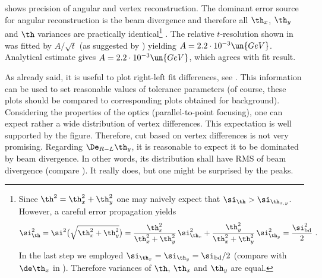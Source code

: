 
 shows precision of angular and vertex reconstruction. The dominant error source for angular reconstruction is the beam divergence and therefore all $\th_x$, $\th_y$ and $\th$ variances are practically identical\footnote{%
Since $\th^2 = \th_x^2 + \th_y^2$ one may naively expect that $\si_{\th} > \si_{\th_{x, y}}$. However, a careful error propagation yields
$$\si^2_{\th} = \si^2\big(\sqrt{\th_x^2 + \th_y^2}\big) = {\th_x^2\over \th_x^2 + \th_y^2}\, \si^2_{\th_x} + {\th_y^2\over \th_x^2 + \th_y^2}\, \si^2_{\th_y} = {\si^2_{\rm bd}\over 2}\ .$$
In the last step we employed $\si_{\th_x} = \si_{\th_y} = \si_{\rm bd}/2$ (compare with $\de\th_x$ in ). Therefore variances of $\th$, $\th_x$ and $\th_y$ are equal.
}%
. The relative $t$-resolution shown in  was fitted by $A/\sqrt{t}$ (as suggested by ) yielding $A = 2.2\cdot10^{-3}\un{GeV}$. Analytical estimate gives $A = 2.2\cdot10^{-3}\un{GeV}$, which agrees with fit result.

As already said, it is useful to plot right-left fit differences, see . This information can be used to set reasonable values of tolerance parameters (of course, these plots should be compared to corresponding plots obtained for background). Considering the properties of the optics (parallel-to-point focusing), one can expect rather a wide distribution of vertex differences. This expectation is well supported by the figure. Therefore, cut based on vertex differences is not very promising. Regarding $\De_{R-L}\th_y$, it is reasonable to expect it to be dominated by beam divergence. In other words, its distribution shall have RMS of beam divergence (compare ). It really does, but one might be surprised by the peaks. 

\break\hbox{}\kern-14mm
\kern-3mm
\kern-3mm

